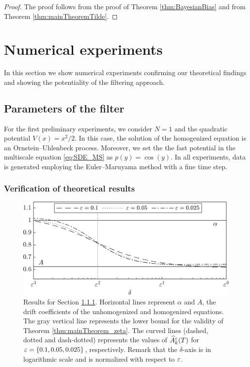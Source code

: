 \documentclass[10pt]{article}
\begin{document}
\begin{proof} The proof follows from the proof of Theorem \ref{thm:BayesianBias} and from Theorem \ref{thm:mainTheoremTilde}.
\end{proof}


\section{Numerical experiments}\label{sec:NumExp}

In this section we show numerical experiments confirming our theoretical findings and showing the potentiality of the filtering approach.

\subsection{Parameters of the filter}\label{sec:Num_Param}

For the first preliminary experiments, we consider $N = 1$ and the quadratic potential $V(x) = x^2/2$. In this case, the solution of the homogenized equation is an Ornstein--Uhlenbeck process. Moreover, we set the the fast potential in the multiscale equation \eqref{eq:SDE_MS} as $p(y) = \cos(y)$. In all experiments, data is generated employing the Euler--Maruyama method with a fine time step.

\subsubsection{Verification of theoretical results}\label{sec:Num_Param1}

\begin{figure}[t]
	\centering
	\includegraphics[]{Figures/Transition}
	\caption{Results for Section \ref{sec:Num_Param1}. Horizontal lines represent $\alpha$ and $A$, the drift coefficients of the unhomogenized and homogenized equations. The gray vertical line represents the lower bound for the validity of Theorem \ref{thm:mainTheorem_zeta}. The curved lines (dashed, dotted and dash-dotted) represents the values of $\widehat A_k^\varepsilon(T)$ for $\varepsilon = \{0.1, 0.05, 0.025\}$, respectively. Remark that the $\delta$-axis is in logarithmic scale and is normalized with respect to $\varepsilon$.}
	\label{fig:TheoremVerification}
\end{figure}
\end{document}
